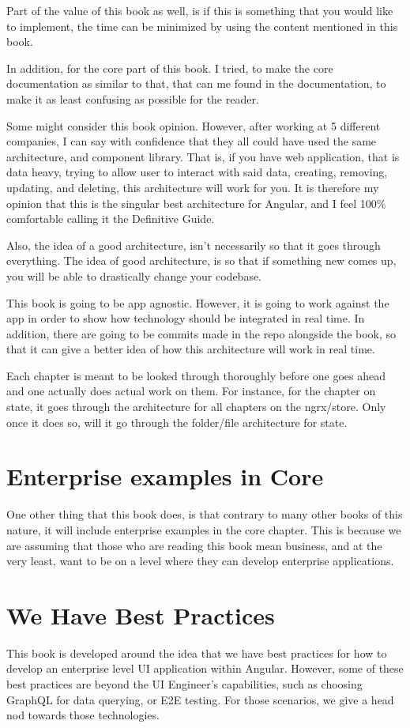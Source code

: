 Part of the value of this book as well, is if this is something that you would
like to implement, the time can be minimized by using the content mentioned
in this book.

In addition, for the core part of this book. I tried, to make the core
documentation as similar to that, that can me found in the documentation, to make
it as least confusing as possible for the reader.

Some might consider this book opinion. However, after working at 5 different
companies, I can say with confidence that they all could have used the same
architecture, and component library. That is, if you have web application, that
is data heavy, trying to allow user to interact with said data, creating,
removing, updating, and deleting, this architecture will work for you. It is
therefore my opinion that this is the singular best architecture for Angular,
and I feel 100\% comfortable calling it the Definitive Guide.

Also, the idea of a good architecture, isn't necessarily so that it goes through
everything. The idea of good architecture, is so that if something new comes up,
you will be able to drastically change your codebase. %

This book is going to be app agnostic. However, it is going to work against the
app in order to show how technology should be integrated in real time. In
addition, there are going to be commits made in the repo alongside the book,
so that it can give a better idea of how this architecture will work in real
time.

Each chapter is meant to be looked through thoroughly before one goes ahead and
one actually does actual work on them. For instance, for the chapter on state,
it goes through the architecture for all chapters on the ngrx/store. Only once
it does so, will it go through the folder/file architecture for state.

\section{Enterprise examples in Core}
One other thing that this book does, is that contrary to many other books of
this nature, it will include enterprise examples in the core chapter. This is
because we are assuming that those who are reading this book mean business, and 
at the very least, want to be on a level where they can develop enterprise
applications.

\section{ We Have Best Practices }
This book is developed around the idea that we have best practices for how to
develop an enterprise level UI application within Angular. However, some of 
these best practices are beyond the UI Engineer's capabilities, such as 
choosing GraphQL for data querying, or E2E testing. For those scenarios, we 
give a head nod towards those technologies. 
